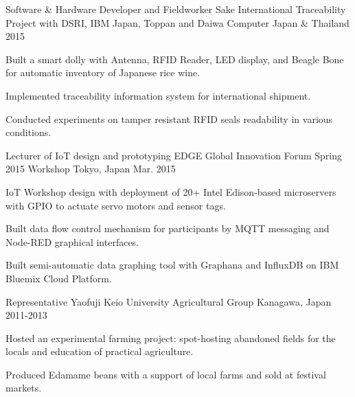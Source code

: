 

\begin{cventries}

  \cventry
    {Software \& Hardware Developer and Fieldworker} %
    {Sake International Traceability Project with DSRI, IBM Japan, Toppan and Daiwa Computer} %
    {Japan \& Thailand} %
    {2015} %
    {
      \begin{cvitems} %
        \item {Built a smart dolly with Antenna, RFID Reader, LED display, and Beagle Bone for automatic inventory of Japanese rice wine.}
        \item {Implemented traceability information system for international shipment.}
        \item {Conducted experiments on tamper resistant RFID seals readability in various conditions.}
      \end{cvitems}
    }

  \cventry
    {Lecturer of IoT design and prototyping} %
    {EDGE Global Innovation Forum Spring 2015 Workshop} %
    {Tokyo, Japan} %
    {Mar. 2015} %
    {
      \begin{cvitems} %
        \item {IoT Workshop design with deployment of 20+ Intel Edison-based microservers with GPIO to actuate servo motors and sensor tags.}
        \item {Built data flow control mechanism for participants by MQTT messaging and Node-RED graphical interfaces.}
        \item {Built semi-automatic data graphing tool with Graphana and InfluxDB on IBM Bluemix Cloud Platform.}
      \end{cvitems}
    }

  \cventry
    {Representative} %
    {Yaofuji Keio University Agricultural Group} %
    {Kanagawa, Japan} %
    {2011-2013} %
    {
      \begin{cvitems} %
        \item {Hosted an experimental farming project: spot-hosting abandoned fields for the locals and education of practical agriculture.}
        \item {Produced Edamame beans with a support of local farms and sold at festival markets.}
      \end{cvitems}
    }

\end{cventries}
